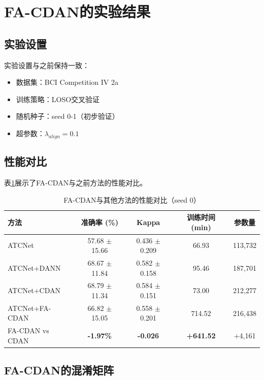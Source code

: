 \documentclass[12pt,a4paper]{ctexart}
\begin{document}
\section{FA-CDAN的实验结果}

\subsection{实验设置}

实验设置与之前保持一致：
\begin{itemize}
    \item 数据集：BCI Competition IV 2a
    \item 训练策略：LOSO交叉验证
    \item 随机种子：seed 0-1（初步验证）
    \item 超参数：$\lambda_{align} = 0.1$
\end{itemize}

\subsection{性能对比}

表\ref{tab:fa_cdan_comparison}展示了FA-CDAN与之前方法的性能对比。

\begin{table}[H]
\centering
\caption{FA-CDAN与其他方法的性能对比（seed 0）}
\label{tab:fa_cdan_comparison}
\begin{tabular}{lcccc}
\toprule
\textbf{方法} & \textbf{准确率 (\%)} & \textbf{Kappa} & \textbf{训练时间 (min)} & \textbf{参数量} \\
\midrule
ATCNet & 57.68 $\pm$ 15.66 & 0.436 $\pm$ 0.209 & 66.93 & 113,732 \\
ATCNet+DANN & 68.67 $\pm$ 11.84 & 0.582 $\pm$ 0.158 & 95.46 & 187,701 \\
ATCNet+CDAN & 68.79 $\pm$ 11.34 & 0.584 $\pm$ 0.151 & 73.00 & 212,277 \\
ATCNet+FA-CDAN & 66.82 $\pm$ 15.05 & 0.558 $\pm$ 0.201 & 714.52 & 216,438 \\
\midrule
FA-CDAN vs CDAN & \textbf{-1.97\%} & \textbf{-0.026} & \textbf{+641.52} & +4,161 \\
\bottomrule
\end{tabular}
\end{table}

\subsection{FA-CDAN的混淆矩阵}
\end{document}
